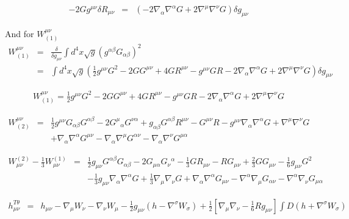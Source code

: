\documentclass[10pt,letterpaper]{article}
\numberwithin{equation}{section}
\begin{document}
\begin{appendices}
\begin{eqnarray}
-2G g^{\mu\nu} \delta R_{\mu\nu} &=& (-2 \nabla_\alpha \nabla^\alpha G + 2\nabla^\mu \nabla^\nu G)\delta g_{\mu\nu}
\end{eqnarray}

And for $W_{(1)}^{\mu\nu}$
\begin{eqnarray}
W_{(1)}^{\mu\nu} &=& \frac{\delta}{\delta g_{\mu\nu}} \int d^4x \sqrt g (g^{\alpha\beta}G_{\alpha\beta})^2
\nonumber\\
&=& \int d^4x \sqrt g \left(\tfrac12 g^{\mu\nu} G^2 -2 G G^{\mu\nu} + 4G R^{\mu\nu} - g^{\mu\nu}G R
-2\nabla_\alpha \nabla^\alpha G + 2\nabla^\mu \nabla^\nu G \right)\delta g_{\mu\nu}
\end{eqnarray}

\begin{eqnarray}
W^{\mu\nu}_{(1)} = \tfrac12 g^{\mu\nu} G^2 -2 G G^{\mu\nu} + 4G R^{\mu\nu} - g^{\mu\nu}G R
-2\nabla_\alpha \nabla^\alpha G + 2\nabla^\mu \nabla^\nu G
\end{eqnarray}

\begin{eqnarray}
W^{\mu\nu}_{(2)}&=&  \frac12 g^{\mu\nu} G_{\alpha\beta}G^{\alpha\beta}
-2G^{\mu}{}_\alpha G^{\nu\alpha} +g_{\alpha\beta}G^{\alpha\beta}R^{\mu\nu}-G^{\mu\nu} R - g^{\mu\nu} \nabla_\alpha \nabla^\alpha G + \nabla^\mu \nabla^\nu G
\nonumber\\
&& + \nabla_\alpha\nabla^\alpha G^{\mu\nu} - \nabla_\alpha \nabla^\mu G^{\alpha\nu} - \nabla_\alpha\nabla^\nu G^{\mu\alpha}
\end{eqnarray}

\begin{eqnarray}
W^{(2)}_{\mu\nu} - \tfrac13 W^{(1)}_{\mu\nu}&=& 
\tfrac12 g_{\mu\nu} G^{\alpha\beta}G_{\alpha\beta} - 2 G_{\mu\alpha}G_{\nu}{}^\alpha - \tfrac13 G R_{\mu\nu}-R G_{\mu\nu}+\tfrac23 G G_{\mu\nu} -\tfrac16 g_{\mu\nu} G^2
\nonumber\\
&&
-\tfrac13 g_{\mu\nu} \nabla_\alpha\nabla^\alpha G + \tfrac13 \nabla_\mu\nabla_\nu G + \nabla_\alpha\nabla^\alpha G_{\mu\nu} - \nabla^\alpha \nabla_\mu G_{\alpha\nu}-\nabla^\alpha \nabla_\nu G_{\mu\alpha}
\end{eqnarray}

\begin{eqnarray}
h_{\mu\nu}^{T\theta}&=&h_{\mu\nu} - \nabla_\mu W_\nu - \nabla_\nu W_\mu -\frac12 g_{\mu\nu}(h-\nabla^\sigma W_\sigma) +\frac12 \left[\nabla_\mu \nabla_\nu -\frac16 R g_{\mu\nu} \right]\int D(h+\nabla^\sigma W_\sigma)
\end{eqnarray}


\end{appendices}
\end{document}
